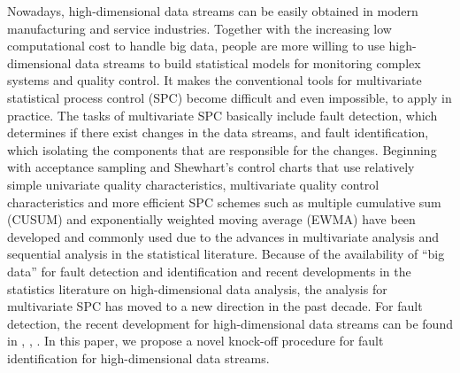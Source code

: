 \documentclass[a4paper,12pt]{article}
\begin{document}
Nowadays, high-dimensional data streams can be easily obtained in modern manufacturing and service industries. Together with the increasing low computational cost to handle big data, people are more willing to use high-dimensional data streams to build statistical models for monitoring complex systems and quality control. It makes the conventional tools for multivariate statistical process control (SPC) become difficult and even impossible, to apply in practice. The tasks of multivariate SPC basically include fault detection, which determines if there exist changes in the data streams, and fault identification, which isolating the components that are responsible for the changes. Beginning with acceptance sampling and Shewhart’s control charts that use relatively simple univariate quality characteristics, multivariate quality control characteristics and more efficient SPC schemes such as multiple cumulative sum (CUSUM) and exponentially weighted moving average (EWMA) have been developed and commonly used due to the advances in multivariate analysis and sequential analysis in the statistical literature. Because of the availability of “big data” for fault detection and identification and recent developments in the statistics literature on high-dimensional data analysis, the analysis for multivariate SPC has moved to a new direction in the past decade. For fault detection, the recent development for high-dimensional data streams can be found in \cite{woodall2014some}, \cite{zou2015efficient}, \cite{xian2018nonparametric}. In this paper, we propose a novel knock-off procedure for fault identification for high-dimensional data streams.
\end{document}
